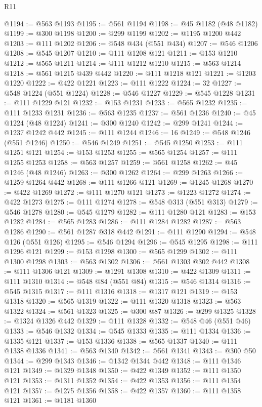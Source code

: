 \begin{lexlean}{R11}
\begin{coremodule}
@1194 := @563 @1193
@1195 := @561 @1194
@1198 := @45 @1182 (@48 @1182)
@1199 := @300 @1198
@1200 := @299 @1199
@1202 := @1195 @1200 @442
@1203 := @111 @1202
@1206 := @548 @434 (@551 @434)
@1207 := @546 @1206
@1208 := @545 @1207
@1210 := @111 @1208 @121
@1211 := @153 @1210
@1212 := @565 @1211
@1214 := @111 @1212 @1210
@1215 := @563 @1214
@1218 := @561 @1215 @439 @442
@1220 := @111 @1218 @121
@1221 := @1203 @1220
@1222 := @422 @1221
@1223 := @111 @1222
@1224 := 32
@1227 := @548 @1224 (@551 @1224)
@1228 := @546 @1227
@1229 := @545 @1228
@1231 := @111 @1229 @121
@1232 := @153 @1231
@1233 := @565 @1232
@1235 := @111 @1233 @1231
@1236 := @563 @1235
@1237 := @561 @1236
@1240 := @45 @1224 (@48 @1224)
@1241 := @300 @1240
@1242 := @299 @1241
@1244 := @1237 @1242 @442
@1245 := @111 @1244
@1246 := 16
@1249 := @548 @1246 (@551 @1246)
@1250 := @546 @1249
@1251 := @545 @1250
@1253 := @111 @1251 @121
@1254 := @153 @1253
@1255 := @565 @1254
@1257 := @111 @1255 @1253
@1258 := @563 @1257
@1259 := @561 @1258
@1262 := @45 @1246 (@48 @1246)
@1263 := @300 @1262
@1264 := @299 @1263
@1266 := @1259 @1264 @442
@1268 := @111 @1266 @121
@1269 := @1245 @1268
@1270 := @422 @1269
@1272 := @111 @1270 @121
@1273 := @1223 @1272
@1274 := @422 @1273
@1275 := @111 @1274
@1278 := @548 @313 (@551 @313)
@1279 := @546 @1278
@1280 := @545 @1279
@1282 := @111 @1280 @121
@1283 := @153 @1282
@1284 := @565 @1283
@1286 := @111 @1284 @1282
@1287 := @563 @1286
@1290 := @561 @1287 @318 @442
@1291 := @111 @1290
@1294 := @548 @126 (@551 @126)
@1295 := @546 @1294
@1296 := @545 @1295
@1298 := @111 @1296 @121
@1299 := @153 @1298
@1300 := @565 @1299
@1302 := @111 @1300 @1298
@1303 := @563 @1302
@1306 := @561 @1303 @302 @442
@1308 := @111 @1306 @121
@1309 := @1291 @1308
@1310 := @422 @1309
@1311 := @111 @1310
@1314 := @548 @84 (@551 @84)
@1315 := @546 @1314
@1316 := @545 @1315
@1317 := @111 @1316
@1318 := @1317 @121
@1319 := @153 @1318
@1320 := @565 @1319
@1322 := @111 @1320 @1318
@1323 := @563 @1322
@1324 := @561 @1323
@1325 := @300 @87
@1326 := @299 @1325
@1328 := @1324 @1326 @442
@1329 := @111 @1328
@1332 := @548 @46 (@551 @46)
@1333 := @546 @1332
@1334 := @545 @1333
@1335 := @111 @1334
@1336 := @1335 @121
@1337 := @153 @1336
@1338 := @565 @1337
@1340 := @111 @1338 @1336
@1341 := @563 @1340
@1342 := @561 @1341
@1343 := @300 @50
@1344 := @299 @1343
@1346 := @1342 @1344 @442
@1348 := @111 @1346 @121
@1349 := @1329 @1348
@1350 := @422 @1349
@1352 := @111 @1350 @121
@1353 := @1311 @1352
@1354 := @422 @1353
@1356 := @111 @1354 @121
@1357 := @1275 @1356
@1358 := @422 @1357
@1360 := @111 @1358 @121
@1361 := @1181 @1360

\end{coremodule}
\end{lexlean}
